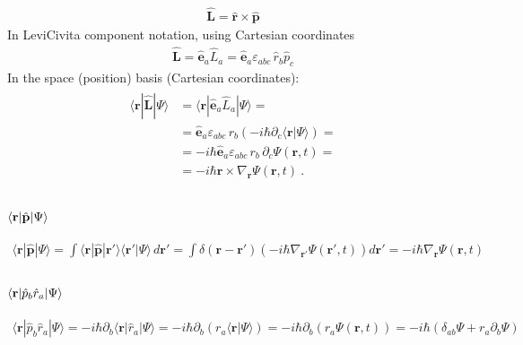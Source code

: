 \documentclass[letterpaper,10pt,english]{jupyterBook}
\begin{document}
\begin{equation*}
\begin{split}\hat{\mathbf{L}} = \hat{\mathbf{r}} \times \hat{\mathbf{p}}\end{split}
\end{equation*}
\sphinxAtStartPar
In Levi\sphinxhyphen{}Civita component notation, using Cartesian coordinates
\begin{equation*}
\begin{split}\hat{\mathbf{L}} = \hat{\mathbf{e}}_a \hat{L}_a =  \hat{\mathbf{e}}_a \varepsilon_{abc} \, \hat{r}_b \hat{p}_c\end{split}
\end{equation*}
\sphinxAtStartPar
In the space (position) basis (Cartesian coordinates):
\begin{equation*}
\begin{split}\begin{aligned}
  \langle \mathbf{r} | \hat{\mathbf{L}} | \Psi \rangle 
  & = \langle \mathbf{r} | \hat{\mathbf{e}}_a \hat{L}_a | \Psi \rangle = \\
  & = \hat{\mathbf{e}}_a \varepsilon_{abc} \, r_b (-i\hbar \partial_c \langle \mathbf{r} | \Psi \rangle) = \\
  & =-i\hbar \hat{\mathbf{e}}_a \varepsilon_{abc} \, r_b \, \partial_c \Psi(\mathbf{r},t) = \\
  & = - i \hbar \mathbf{r} \times \nabla_{\mathbf{r}} \Psi(\mathbf{r},t) \ .
\end{aligned}\end{split}
\end{equation*}\subsubsection*{\protect\(\langle \mathbf{r} | \hat{\mathbf{p}} | \Psi \rangle\protect\)}
\begin{equation*}
\begin{split}\langle \mathbf{r} | \hat{\mathbf{p}} | \Psi \rangle = \int \langle \mathbf{r} | \hat{\mathbf{p}} | \mathbf{r}' \rangle \langle \mathbf{r}' | \Psi \rangle \, d\mathbf{r}' = \int \delta(\mathbf{r} - \mathbf{r}') \left(-i\hbar \nabla_{\mathbf{r}'} \Psi(\mathbf{r}', t)\right) d\mathbf{r}' = -i\hbar \nabla_{\mathbf{r}} \Psi(\mathbf{r}, t)\end{split}
\end{equation*}\subsubsection*{\protect\(\langle \mathbf{r} | \hat{p}_b \hat{r}_a | \Psi \rangle\protect\)}
\begin{equation*}
\begin{split}\langle \mathbf{r} | \hat{p}_b \hat{r}_a | \Psi \rangle = -i\hbar \partial_b \langle \mathbf{r} | \hat{r}_a | \Psi \rangle  = -i\hbar \partial_b \left( r_a \langle \mathbf{r} | \Psi \rangle \right) = - i \hbar \partial_b \left( r_a \Psi(\mathbf{r},t) \right) = -i\hbar (\delta_{ab} \Psi + r_a \partial_b \Psi)\end{split}
\end{equation*}
\end{document}
